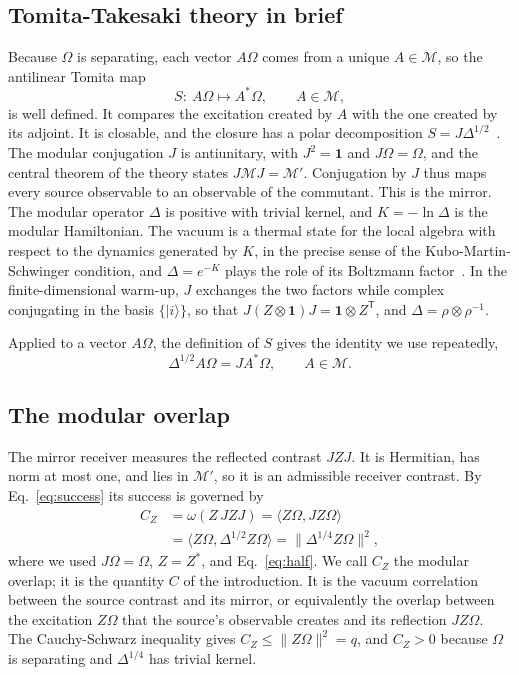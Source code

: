 \documentclass[11pt,a4paper]{article}
\providecommand{\openone}{\mathbf{1}}
\newcommand{\M}{\mathcal M}
\newcommand{\id}{\openone}
\begin{document}
\subsection{Tomita-Takesaki theory in brief}

Because $\Omega$ is separating, each vector $A\Omega$ comes from a unique $A\in\M$, so the antilinear Tomita map
\begin{equation*}
 S:\ A\Omega\mapsto A^*\Omega,\qquad A\in\M,
\end{equation*}
is well defined. It compares the excitation created by $A$ with the one created by its adjoint. It is closable, and the closure has a polar decomposition $S=J\Delta^{1/2}$~\cite{witten2018aps}. The modular conjugation $J$ is antiunitary, with $J^2=\id$ and $J\Omega=\Omega$, and the central theorem of the theory states $J\M J=\M'$. Conjugation by $J$ thus maps every source observable to an observable of the commutant. This is the mirror. The modular operator $\Delta$ is positive with trivial kernel, and $K=-\ln\Delta$ is the modular Hamiltonian. The vacuum is a thermal state for the local algebra with respect to the dynamics generated by $K$, in the precise sense of the Kubo-Martin-Schwinger condition, and $\Delta=e^{-K}$ plays the role of its Boltzmann factor~\cite{witten2018aps}. In the finite-dimensional warm-up, $J$ exchanges the two factors while complex conjugating in the basis $\{|i\rangle\}$, so that $J(Z\otimes\id)J=\id\otimes Z^{\mathsf T}$, and $\Delta=\rho\otimes\rho^{-1}$.

Applied to a vector $A\Omega$, the definition of $S$ gives the identity we use repeatedly,
\begin{equation}
 \Delta^{1/2}A\Omega=JA^*\Omega,\qquad A\in\M .
 \label{eq:half}
\end{equation}

\subsection{The modular overlap}

The mirror receiver measures the reflected contrast $JZJ$. It is Hermitian, has norm at most one, and lies in $\M'$, so it is an admissible receiver contrast. By Eq.~\eqref{eq:success} its success is governed by
\begin{equation}
 \begin{aligned}
 C_Z&=\omega(Z\,JZJ)=\langle Z\Omega,JZ\Omega\rangle\\
 &=\langle Z\Omega,\Delta^{1/2}Z\Omega\rangle=\|\Delta^{1/4}Z\Omega\|^2 ,
 \end{aligned}
 \label{eq:overlap}
\end{equation}
where we used $J\Omega=\Omega$, $Z=Z^*$, and Eq.~\eqref{eq:half}. We call $C_Z$ the modular overlap; it is the quantity $C$ of the introduction. It is the vacuum correlation between the source contrast and its mirror, or equivalently the overlap between the excitation $Z\Omega$ that the source's observable creates and its reflection $JZ\Omega$. The Cauchy-Schwarz inequality gives $C_Z\le\|Z\Omega\|^2=q$, and $C_Z>0$ because $\Omega$ is separating and $\Delta^{1/4}$ has trivial kernel.
\end{document}
